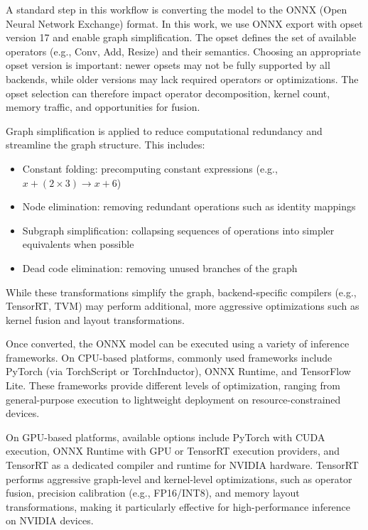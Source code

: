\documentclass[12pt,a4paper]{report}
\begin{document}
A standard step in this workflow is converting the model to the ONNX (Open Neural Network Exchange) format.
In this work, we use ONNX export with opset version 17 and enable graph simplification. The opset defines the
set of available operators (e.g., Conv, Add, Resize) and their semantics. Choosing an appropriate opset
version is important: newer opsets may not be fully supported by all backends, while older versions may
lack required operators or optimizations. The opset selection can therefore impact operator decomposition,
kernel count, memory traffic, and opportunities for fusion.

Graph simplification is applied to reduce computational redundancy and streamline the graph structure.
This includes:
\begin{itemize}
\item
Constant folding: precomputing constant expressions (e.g., $x + (2 \times 3) \rightarrow x + 6$)
\item
Node elimination: removing redundant operations such as identity mappings
\item
Subgraph simplification: collapsing sequences of operations into simpler equivalents when possible
\item
Dead code elimination: removing unused branches of the graph

\end{itemize}


While these transformations simplify the graph, backend-specific compilers (e.g., TensorRT, TVM) may perform
additional, more aggressive optimizations such as kernel fusion and layout transformations.

Once converted, the ONNX model can be executed using a variety of inference frameworks. On CPU-based platforms,
commonly used frameworks include PyTorch (via TorchScript or TorchInductor), ONNX Runtime, and TensorFlow Lite.
These frameworks provide different levels of optimization, ranging from general-purpose execution to lightweight
deployment on resource-constrained devices.

On GPU-based platforms, available options include PyTorch with CUDA execution, ONNX Runtime with GPU or TensorRT
execution providers, and TensorRT as a dedicated compiler and runtime for NVIDIA hardware. TensorRT performs
aggressive graph-level and kernel-level optimizations, such as operator fusion, precision calibration
(e.g., FP16/INT8), and memory layout transformations, making it particularly effective for high-performance
inference on NVIDIA devices.
\end{document}
